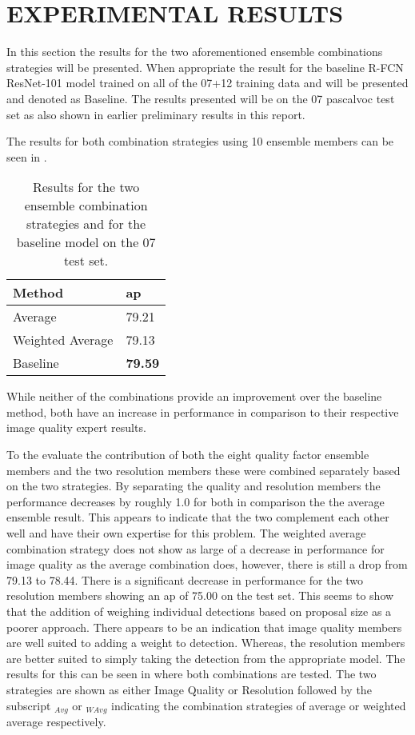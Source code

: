 \documentclass[a4paper,twoside]{article}
\begin{document}
\section{\uppercase{Experimental Results}}
In this section the results for the two aforementioned ensemble combinations strategies will be presented. When appropriate the result for the baseline R-FCN ResNet-101 model trained on all of the 07+12 training data and will be presented and denoted as Baseline. The results presented will be on the 07 \gls{pascalvoc} test set as also shown in earlier preliminary results in this report.

The results for both combination strategies using 10 ensemble members can be seen in .

\begin{table}[h]
\centering
\caption{Results for the two ensemble combination strategies and for the baseline model on the 07 test set.}
\label{tab:avgres1}
\begin{tabular}{|l|l|}
\hline
\textbf{Method}           & \textbf{\gls{ap}} \\ \hline
Average          & 79.21 \\ \hline
Weighted Average & 79.13 \\ \hline
Baseline         & \textbf{79.59} \\ \hline
\end{tabular}
\end{table}

While neither of the combinations provide an improvement over the baseline method, both have an increase in performance in comparison to their respective image quality expert results. 

To the evaluate the contribution of both the eight quality factor ensemble members and the two resolution members these were combined separately based on the two strategies. By separating the quality and resolution members the performance decreases by roughly 1.0 for both in comparison the the average ensemble result. This appears to indicate that the two complement each other well and have their own expertise for this problem. The weighted average combination strategy does not show as large of a decrease in performance for image quality as the average combination does, however, there is still a drop from 79.13 to 78.44. There is a significant decrease in performance for the two resolution members showing an \gls{ap} of 75.00 on the test set. This seems to show that the addition of weighing individual detections based on proposal size as a poorer approach. There appears to be an indication that image quality members are well suited to adding a weight to detection. Whereas, the resolution members are better suited to simply taking the detection from the appropriate model. The results for this can be seen in  where both combinations are tested. The two strategies are shown as either Image Quality or Resolution followed by the subscript $_{Avg}$ or $_{WAvg}$ indicating the combination strategies of average or weighted average respectively. 
\end{document}

